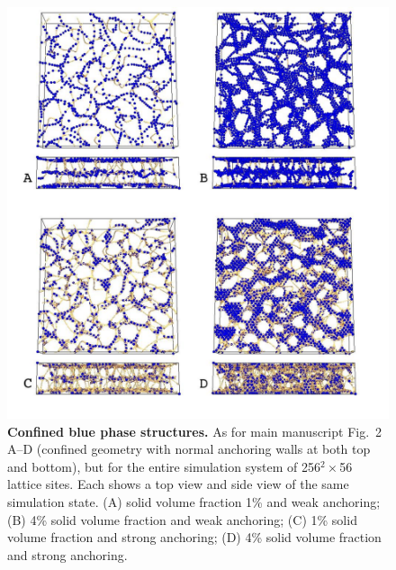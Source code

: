 \documentclass[12pt,twoside]{article}
\begin{document}
\begin{figure}[!h]
\begin{center}
\includegraphics[scale=0.42]{support-fig5.pdf}
\end{center}
\caption{\textbf{Confined blue phase structures.}
As for main manuscript Fig.~2 A--D (confined geometry with normal
anchoring walls at both top and bottom), but for the entire simulation
system of 256$^2\times$56 lattice sites. Each shows a top view and
side view of the same simulation state. (A) solid volume fraction 1\%
and weak anchoring; (B) 4\% solid volume fraction and weak anchoring;
(C) 1\% solid volume fraction and strong anchoring; (D) 4\% solid
volume fraction and strong anchoring.}
\end{figure}

\newpage
\end{document}
